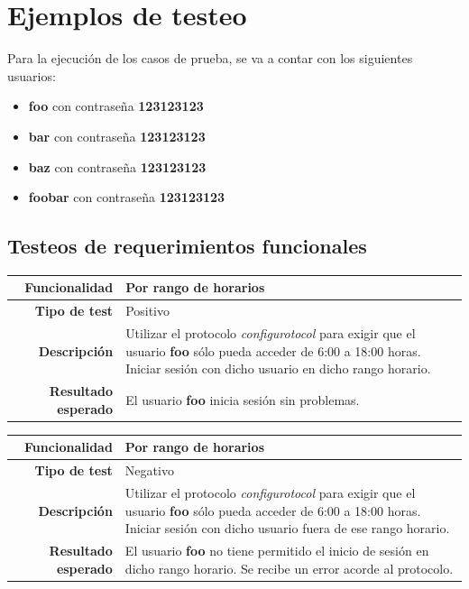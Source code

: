 \documentclass[a4paper,10pt]{article}
\begin{document}
\section{Ejemplos de testeo}
Para la ejecución de los casos de prueba, se va a contar con los siguientes usuarios:
\begin{itemize}
 \item \textbf{foo} con contraseña \textbf{123123123}
 \item \textbf{bar} con contraseña \textbf{123123123}
 \item \textbf{baz} con contraseña \textbf{123123123}
 \item \textbf{foobar} con contraseña \textbf{123123123}
\end{itemize}

\subsection{Testeos de requerimientos funcionales}

\begin{center}
  \begin{tabular}{|r|p{12.5cm}|}
    \hline
    \textbf{Funcionalidad}	&	Por rango de horarios\\
    \hline
    \textbf{Tipo de test}	&	Positivo\\
    \hline
    \textbf{Descripción}	&	Utilizar el protocolo \textit{configurotocol} para exigir que el usuario
					\textbf{foo} sólo pueda acceder de 6:00 a 18:00 horas. Iniciar sesión con
					dicho usuario en dicho rango horario.\\
    \hline
    \textbf{Resultado esperado}	&	El usuario \textbf{foo} inicia sesión sin problemas.\\
    \hline   
  \end{tabular}
\end{center}

\begin{center}
  \begin{tabular}{|r|p{12.5cm}|}
    \hline
    \textbf{Funcionalidad}	&	Por rango de horarios\\
    \hline
    \textbf{Tipo de test}	&	Negativo\\
    \hline
    \textbf{Descripción}	&	Utilizar el protocolo \textit{configurotocol} para exigir que el usuario
					\textbf{foo} sólo pueda acceder de 6:00 a 18:00 horas. Iniciar sesión con
					dicho usuario fuera de ese rango horario.\\
    \hline
    \textbf{Resultado esperado}	&	El usuario \textbf{foo} no tiene permitido el inicio de sesión en dicho
					rango horario. Se recibe un error acorde al protocolo.\\
    \hline   
  \end{tabular}
\end{center}
\end{document}
